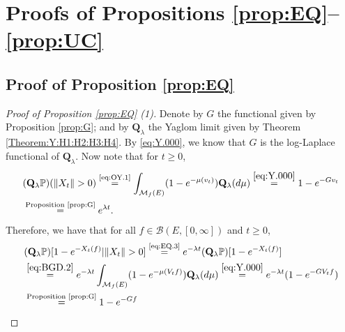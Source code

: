 \documentclass[12pt,a4paper]{amsart}
\numberwithin{equation}{section}
\theoremstyle{plain}
\theoremstyle{definition}
\theoremstyle{remark}
\begin{document}
\section{Proofs of Propositions \ref{prop:EQ}--\ref{prop:UC}}

\subsection{Proof of Proposition \ref{prop:EQ}} \label{sec:EQ}
\begin{proof}[Proof of Proposition \ref{prop:EQ} (1)]	
	Denote by $G$ the functional given by Proposition \ref{prop:G}; and by $\mathbf Q_\lambda$ the Yaglom limit given by Theorem \ref{Theorem:Y:H1:H2:H3:H4}.
	By \eqref{eq:Y.000}, we know that $G$ is the log-Laplace functional of $\mathbf Q_\lambda$. %
	Now note that for $t\geq 0$,
	\begin{align}
	&(\mathbf Q_\lambda \mathbb P) (\|X_t\|>0)
	\overset{\text{\eqref{eq:OY.1}}}= \int_{\mathcal M_f(E)}(1-e^{-\mu(v_t)})\mathbf Q_\lambda (d\mu)
	\overset{\eqref{eq:Y.000}}= 1 - e^{-G v_t}
	\\&\overset{\text{Proposition \ref{prop:G}}}= e^{\lambda t}.  \label{eq:EQ.3}
	\end{align}
	Therefore, we have that for all $f\in \mathcal B(E,[0,\infty])$ and $t \geq 0$,
	\begin{align}
	&(\mathbf Q_\lambda \mathbb P)[1 - e^{-X_t(f)} | \|X_t\| > 0]
	\overset{\text{\eqref{eq:EQ.3}}}= e^{- \lambda t} (\mathbf Q_\lambda \mathbb P)[1- e^{-X_t(f)}]
	\\& \overset{\eqref{eq:BGD.2}}= e^{- \lambda t} \int_{\mathcal M_f(E)} (1- e^{-\mu(V_tf)} ) \mathbf Q_\lambda (d\mu)
	\overset{\eqref{eq:Y.000}}= e^{-\lambda t} (1 - e^{- G V_tf})
	\\& \overset{\text{Proposition \ref{prop:G}}}= 1 - e^{-Gf}

\end{align}
\end{proof}
\end{document}
